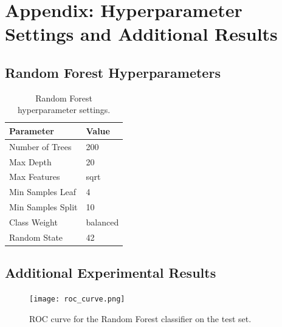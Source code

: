 \documentclass{article}
\begin{document}
\newpage
\appendix

\section{Appendix: Hyperparameter Settings and Additional Results}

\subsection{Random Forest Hyperparameters}
\begin{table}[ht]
    \centering
    \begin{tabular}{ll}
        \toprule
        Parameter             & Value \\
        \midrule
        Number of Trees       & 200 \\
        Max Depth             & 20 \\
        Max Features          & sqrt \\
        Min Samples Leaf      & 4 \\
        Min Samples Split     & 10 \\
        Class Weight          & balanced \\
        Random State          & 42 \\
        \bottomrule
    \end{tabular}
    \caption{Random Forest hyperparameter settings.}
\end{table}

\subsection{Additional Experimental Results}
\begin{figure}[ht]
    \centering
    \texttt{[image: roc\_curve.png]}
    \caption{ROC curve for the Random Forest classifier on the test set.}
    \label{fig:roc}
\end{figure}
\end{document}
